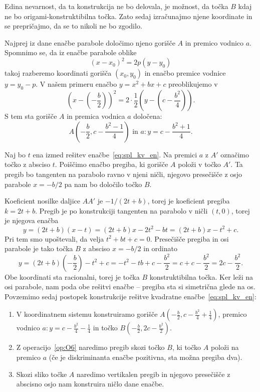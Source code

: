 Edina nevarnost, da ta konstrukcija ne bo delovala, je možnost, da točka $B$ kdaj ne bo origami-konstruktibilna točka. Zato sedaj izračunajmo njene koordinate in se prepričajmo, da se to nikoli ne bo zgodilo.

Najprej iz dane enačbe parabole določimo njeno gorišče $A$ in premico vodnico $a$. Spomnimo se, da iz enačbe parabole oblike
$$ (x - x_0)^2 = 2p(y - y_0) $$
takoj razberemo koordinati gorišča $(x_0, y_0)$ in enačbo premice vodnice $y = y_0 - p$. V našem primeru enačbo $y = x^2 + bx + c$ preoblikujemo v
$$ \left(x-\left(-\frac{b}{2}\right)\right)^2 = 2 \cdot \frac{1}{2} \left(y - \left(c - \frac{b^2}{4}\right)\right). $$
S tem sta gorišče $A$ in premica vodnica $a$ določena:
$$ A\left(-\frac{b}{2}, c - \frac{b^2 - 1}{4}\right) \text{ in } a: y = c - \frac{b^2 + 1}{4}. $$

Naj bo $t$ ena izmed rešitev enačbe~\ref{eq:spl_kv_en}. Na premici $a$ z $A'$ označimo točko z absciso $t$. Poiščimo enačbo pregiba, ki gorišče $A$ položi v točko $A'$. Ta pregib bo tangenten na parabolo ravno v njeni ničli, njegovo presečišče z osjo parabole $ x = -b/2 $ pa nam bo določilo točko $B$.

Koeficient nosilke daljice $AA'$ je $ - 1/(2t + b)$, torej je koeficient pregiba $k = 2t + b$. Pregib je po konstrukciji tangenten na parabolo v ničli $(t, 0)$, torej je njegova enačba
$$ y = (2t + b)(x - t) = (2t + b)x - 2t^2 - bt = (2t + b)x - t^2 + c. $$
Pri tem smo upoštevali, da velja $t^2 + bt + c = 0$. Presečišče pregiba in osi parabole je tako točka $B$ z absciso $ x = -b/2 $ in ordinato
$$ y = (2t + b)\left(-\frac{b}{2}\right) - t^2 + c = - t^2 - tb + c - \frac{b^2}{2} = c + c - \frac{b^2}{2} = 2c - \frac{b^2}{2}.$$
Obe koordinati sta racionalni, torej je točka $B$ konstruktibilna točka. Ker leži na osi parabole, nam poda obe rešitvi enačbe -- pregiba sta si simetrična glede na os. Povzemimo sedaj postopek konstrukcije rešitve kvadratne enačbe~\ref{eq:spl_kv_en}:
\begin{enumerate}
    \item V koordinatnem sistemu konstruiramo gorišče $A\left(-\frac{b}{2}, c - \frac{b^2}{4} + \frac{1}{4}\right)$, premico vodnico $a: y = c - \frac{b^2}{4} - \frac{1}{4}$ in točko $B(-\frac{b}{2}, 2c - \frac{b^2}{2})$.
    \item Z operacijo~\ref{op:O6} naredimo pregib skozi točko $B$, ki točko $A$ položi na premico $a$ (če je diskriminanta enačbe pozitivna, sta možna pregiba dva).
    \item Skozi sliko točke $A$ naredimo vertikalen pregib in njegovo presečišče z abscisno osjo nam konstruira ničlo dane enačbe.
\end{enumerate}

